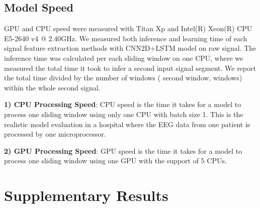 \documentclass[pmlr,twocolumn,10pt]{jmlr}
\begin{document}
\subsection{Model Speed}
\label{sec: speed}
GPU and CPU speed were measured with Titan Xp and Intel(R) Xeon(R) CPU E5-2640 v4 @ 2.40GHz. We measured both inference and learning time of each signal feature extraction methods with CNN2D+LSTM model on raw signal. The inference time was calculated per each sliding window on one CPU, where we measured the total time it took to infer a  second input signal segment. We report the total time divided by the number of windows ( second window,  windows) within the whole  second signal. 

\noindent\textbf{1) CPU Processing Speed}: CPU speed is the time it takes for a model to process one sliding window using only one CPU with batch size 1. This is the realistic model evaluation in a hospital where the EEG data from one patient is processed by one microprocessor.

\noindent\textbf{2) GPU Processing Speed}: GPU speed is the time it takes for a model to process one sliding window using one GPU with the support of 5 CPUs.

\section{Supplementary Results}
\end{document}
